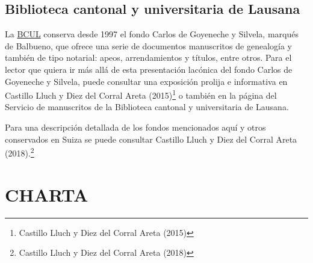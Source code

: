 \documentclass[
]{book}
\begin{document}
\hypertarget{biblioteca-cantonal-y-universitaria-de-lausana}{%
\section*{Biblioteca cantonal y universitaria de Lausana}\label{biblioteca-cantonal-y-universitaria-de-lausana}}

La \href{https://www.bcu-lausanne.ch/}{BCUL} conserva desde 1997 el fondo Carlos de Goyeneche y Silvela, marqués de Balbueno, que ofrece una serie de documentos manuscritos de genealogía y también de tipo notarial: apeos, arrendamientos y títulos, entre otros.
Para el lector que quiera ir más allá de esta presentación lacónica del fondo Carlos de Goyeneche y Silvela, puede consultar una exposición prolija e informativa en Castillo Lluch y Diez del Corral Areta (2015)\footnote{Castillo Lluch y Diez del Corral Areta (2015)} o también en la página del Servicio de manuscritos de la Biblioteca cantonal y universitaria de Lausana.

Para una descripción detallada de los fondos mencionados aquí y otros conservados en Suiza se puede consultar Castillo Lluch y Diez del Corral Areta (2018).\footnote{Castillo Lluch y Diez del Corral Areta (2018)}

\hypertarget{charta}{%
\chapter*{CHARTA}\label{charta}}
\end{document}
